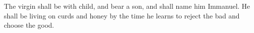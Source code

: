 
\lettrine{T}{}he virgin shall be with child, and bear a son, and shall name him Immanuel. He shall be living on curds and honey by the time he learns to reject the bad and choose the good.